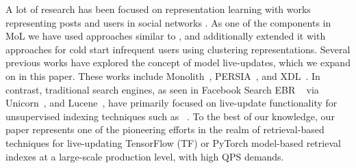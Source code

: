 A lot of research has been focused on representation learning with works representing posts and users in social networks \cite{Que2Search_paper, nxtpost_paper, PinnerSage_paper}. As one of the components in MoL we have used approaches similar to \cite{Que2Search_paper, nxtpost_paper, PinnerSage_paper}, and additionally extended it with approaches for cold start infrequent users using clustering representations.
Several previous works have explored the concept of model live-updates, which we expand on in this paper. These works include Monolith~\cite{liu2022monolith}, PERSIA~\cite{persia_paper}, and XDL~\cite{XDL_paper}. In contrast, traditional search engines, as seen in Facebook Search EBR ~\cite{fb_search_embeddings_paper, Que2Search_paper} via Unicorn~\cite{unicorn_paper}, and Lucene~\cite{Lucene_chen2023endtoend}, have primarily focused on live-update functionality for unsupervised indexing techniques such as ~\cite{FAISS_paper}. To the best of our knowledge, our paper represents one of the pioneering efforts in the realm of retrieval-based techniques for live-updating TensorFlow (TF) or PyTorch model-based retrieval indexes at a large-scale production level, with high QPS demands.

